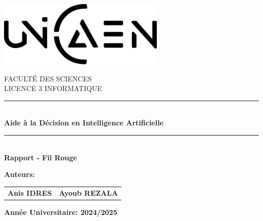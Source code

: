 \documentclass[12pt]{article}
\begin{document}
\begin{titlepage}
    \begin{center}
        \includegraphics[width=8cm]{./images/unicaen.png}\par
        \vspace{0.2cm}
        FACULTÉ DES SCIENCES \\
        LICENCE 3 INFORMATIQUE
        \rule{0.95\textwidth}{2pt}\\
        \vspace{1cm}
        \Huge \textbf{Aide à la Décision en Intelligence Artificielle}\par
        \vspace{0.5cm}
        \rule{0.95\textwidth}{2pt}\\
        \vspace{0.5cm}
        \Large \textbf{Rapport - Fil Rouge}\par
        \vspace{2cm}
    \end{center}
    \Large \textbf{Auteurs:}\\
    \begin{tabular}{p{8cm}p{8cm}}
        \Large \textbf{Anis IDRES}   & \Large \textbf{Ayoub REZALA}  \\
    \end{tabular}
    \vspace{2cm}
    \begin{center}
        \Large \textbf{Année Universitaire: 2024/2025}
    \end{center}
\end{titlepage}

\newpage
{}
\tableofcontents
\newpage

\end{document}
